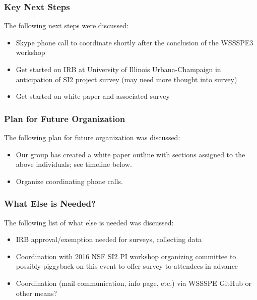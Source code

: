 \subsubsection{Key Next Steps}

The following next steps were discussed:
%
\begin{itemize}
\item
Skype phone call to coordinate shortly after the conclusion of the WSSSPE3 workshop

\item
Get started on IRB at University of Illinois Urbana-Champaign in anticipation of
SI2 project survey (may need more thought into survey)

\item
Get started on white paper and associated survey

\end{itemize}



\subsubsection{Plan for Future Organization}

The following plan for future organization was discussed:
%
\begin{itemize}
\item
Our group has created a white paper outline with sections assigned to the above
individuals; see timeline below. %

\item
Organize coordinating phone calls.

\end{itemize}




\subsubsection{What Else is Needed?}

The following list of what else is needed was discussed:

\begin{itemize}
\item
IRB approval/exemption needed for surveys, collecting data

\item
Coordination with 2016 NSF SI2 PI workshop organizing committee to possibly
piggyback on this event to offer survey to attendees in advance

\item
Coordination (mail communication, info page, etc.) via WSSSPE GitHub or other
means?

\end{itemize}



